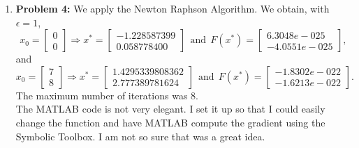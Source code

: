 \documentclass[letterpaper]{article}
\begin{document}
\begin{enumerate}
\begin{enumerate}
\item  \textbf{Will exhibit:} An $\epsilon>0$ and a sequence $(x_n)$ that that for all $n\ge 1$, $|x_n-x_0| < \frac{1}{n}$ and $|f(x_n)-f(x_0)|\ge \epsilon.$ It will clearly follow that $x_n \rightarrow x_0$, but $f(x_n) \not \rightarrow f(x_0)$.\\

    Because $f$ is not continuous at $x_0$, there exists some $\epsilon >0$ such that, for all $\delta>0$, there exists $x \in B_{\delta}(x_0)$ such that $|f(x) - f(x_0)| \ge \epsilon$.  We set $\delta = \frac{1}{n}$, and choose $x_n$ such that $|x_n-x_0| < \frac{1}{n}$ and $|f(x_n)-f(x_0)|\ge \epsilon.$ We are done!

\end{enumerate}

\item \noindent \textbf{Problem 4:} We apply the Newton Raphson Algorithm. We obtain, with $\epsilon=1$,
$$x_0=\left[ \begin{array}{r}  0\\ 0\end{array}\right] \Rightarrow x^* = \left[ \begin{array}{r} -1.228587399\\ 0.058778400\end{array}\right]~~\text{and}~~F(x^*) =  \left[ \begin{array}{r}  6.3048e-025\\ -4.0551e-025\end{array}\right],$$
and
$$x_0=\left[ \begin{array}{r}  7\\ 8\end{array}\right] \Rightarrow x^* = \left[ \begin{array}{r}1.4295339808362\\ 2.777389781624\end{array}\right]~~\text{and}~~F(x^*) =  \left[ \begin{array}{r}   -1.8302e-022\\ -1.6213e-022\end{array}\right].$$
The maximum number of iterations was 8.\\

The MATLAB code is not very elegant. I set it up so that I could easily change the function and have MATLAB compute the gradient using the Symbolic Toolbox. I am not so sure that was a great idea.
\begin{verbatim}


\end{verbatim}
\end{enumerate}
\end{document}
